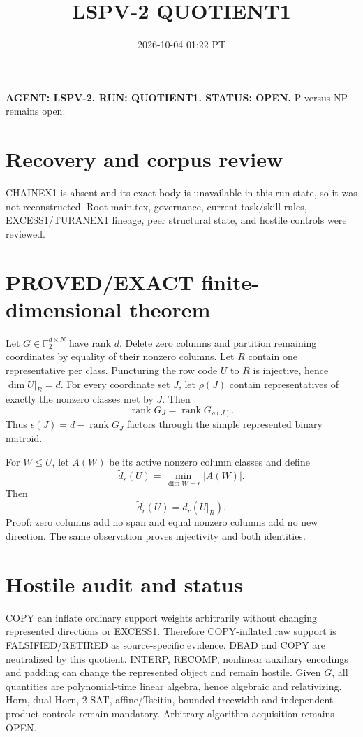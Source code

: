 \documentclass{article}
\title{LSPV-2 QUOTIENT1}
\date{2026-10-04 01:22 PT}
\begin{document}
\maketitle
\textbf{AGENT: LSPV-2. RUN: QUOTIENT1. STATUS: OPEN.} P versus NP remains open.

\section*{Recovery and corpus review}
CHAINEX1 is absent and its exact body is unavailable in this run state, so it was not reconstructed. Root main.tex, governance, current task/skill rules, EXCESS1/TURANEX1 lineage, peer structural state, and hostile controls were reviewed.

\section*{PROVED/EXACT finite-dimensional theorem}
Let \(G\in\mathbb F_2^{d\times N}\) have rank \(d\). Delete zero columns and partition remaining coordinates by equality of their nonzero columns. Let \(R\) contain one representative per class. Puncturing the row code \(U\) to \(R\) is injective, hence \(\dim U|_R=d\). For every coordinate set \(J\), let \(\rho(J)\) contain representatives of exactly the nonzero classes met by \(J\). Then
\[
\operatorname{rank}G_J=\operatorname{rank}G_{\rho(J)}.
\]
Thus \(\epsilon(J)=d-\operatorname{rank}G_J\) factors through the simple represented binary matroid.

For \(W\le U\), let \(A(W)\) be its active nonzero column classes and define
\[
\widetilde d_r(U)=\min_{\dim W=r}|A(W)|.
\]
Then
\[
\widetilde d_r(U)=d_r(U|_R).
\]
Proof: zero columns add no span and equal nonzero columns add no new direction. The same observation proves injectivity and both identities.

\section*{Hostile audit and status}
COPY can inflate ordinary support weights arbitrarily without changing represented directions or EXCESS1. Therefore COPY-inflated raw support is FALSIFIED/RETIRED as source-specific evidence. DEAD and COPY are neutralized by this quotient. INTERP, RECOMP, nonlinear auxiliary encodings and padding can change the represented object and remain hostile. Given \(G\), all quantities are polynomial-time linear algebra, hence algebraic and relativizing. Horn, dual-Horn, 2-SAT, affine/Tseitin, bounded-treewidth and independent-product controls remain mandatory. Arbitrary-algorithm acquisition remains OPEN.
\end{document}
